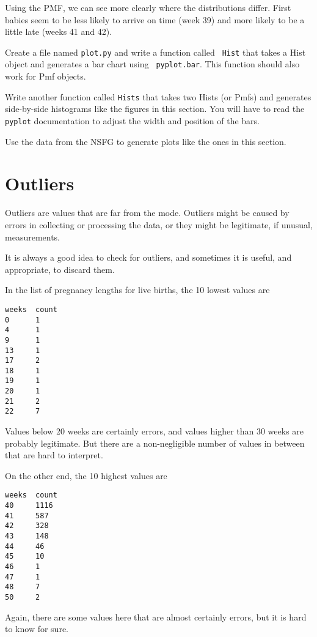 \documentclass[10pt]{book}
\begin{document}
Using the PMF, we can see more clearly where the distributions
differ.  First babies seem to be less likely to arrive on time
(week 39) and more likely to be a little late (weeks 41 and 42).

\begin{ex}
Create a file named {\tt plot.py} and write a function called {\tt
  Hist} that takes a Hist object and generates a bar chart using {\tt
  pyplot.bar}.  This function should also work for Pmf objects.

Write another function called {\tt Hists} that takes two Hists (or Pmfs)
and generates side-by-side histograms like the figures in this
section.  You will have to read the {\tt pyplot} documentation to
adjust the width and position of the bars.

Use the data from the NSFG to generate plots like the ones in this
section.
\end{ex}


\section{Outliers}

Outliers are values that are far from the mode.  Outliers might
be caused by errors in collecting or processing the data, or
they might be legitimate, if unusual, measurements.

It is always a good idea to check for outliers, and sometimes
it is useful, and appropriate, to discard them.

In the list of pregnancy lengths for live births, the 10 lowest values are

\begin{verbatim}
weeks  count
0      1
4      1
9      1
13     1
17     2
18     1
19     1
20     1
21     2
22     7
\end{verbatim}

Values below 20 weeks are certainly errors, and values higher than 30
weeks are probably legitimate.  But there are a non-negligible number of
values in between that are hard to interpret.

On the other end, the 10 highest values are

\begin{verbatim}
weeks  count
40     1116
41     587
42     328
43     148
44     46
45     10
46     1
47     1
48     7
50     2
\end{verbatim}

Again, there are some values here that are almost certainly errors, but
it is hard to know for sure.
\end{document}
